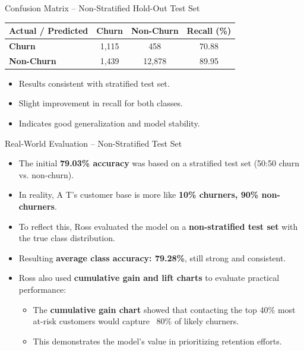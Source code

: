 \documentclass[aspectratio=169,xcolor=dvipsnames]{beamer}
\begin{document}
\begin{frame}{Confusion Matrix – Non-Stratified Hold-Out Test Set}

\begin{table}[ht]
\centering
\begin{tabular}{l|cc|c}
\textbf{Actual / Predicted} & \textbf{Churn} & \textbf{Non-Churn} & \textbf{Recall (\%)} \\
\hline
\textbf{Churn}      & 1,115 & 458    & 70.88 \\
\textbf{Non-Churn}  & 1,439 & 12,878 & 89.95 \\
\end{tabular}
\end{table}

\vspace{1em}
\begin{itemize}
  \item Results consistent with stratified test set.
  \item Slight improvement in recall for both classes.
  \item Indicates good generalization and model stability.
\end{itemize}

\end{frame}

\begin{frame}{Real-World Evaluation – Non-Stratified Test Set}

\begin{itemize}
  \item The initial \textbf{79.03\% accuracy} was based on a stratified test set (50:50 churn vs. non-churn).
  \item In reality, A T’s customer base is more like \textbf{10\% churners, 90\% non-churners}.
  \item To reflect this, Ross evaluated the model on a \textbf{non-stratified test set} with the true class distribution.
  \item Resulting \textbf{average class accuracy: 79.28\%}, still strong and consistent.
  \item Ross also used \textbf{cumulative gain and lift charts} to evaluate practical performance:
  \begin{itemize}
    \item The \textbf{cumulative gain chart} showed that contacting the top 40\% most at-risk customers would capture ~80\% of likely churners.
    \item This demonstrates the model's value in prioritizing retention efforts.
  \end{itemize}
\end{itemize}

\end{frame}
\end{document}
